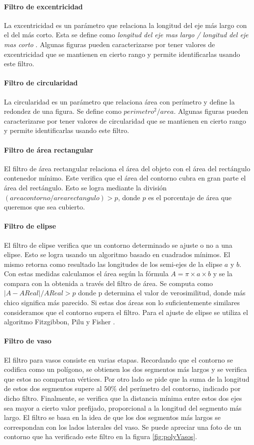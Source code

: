 	\paragraph{Filtro de excentricidad}
	La excentricidad es un parámetro que relaciona la longitud del eje más largo con el del más corto. Esta se define como 
	\textit { longitud del eje mas largo / longitud del eje mas corto}  . Algunas figuras pueden caracterizarse por tener valores de excentricidad
	que se mantienen en cierto rango y permite identificarlas usando este filtro.
	\paragraph{Filtro de circularidad}
	La circularidad es un parámetro que relaciona área con perímetro y define la redondez de una figura. Se define como $perimetro^2/area$. Algunas figuras pueden 
	caracterizarse por tener valores de circularidad que se mantienen en cierto rango y permite identificarlas usando este filtro.
	\paragraph{Filtro de área rectangular}
	El filtro de área rectangular relaciona el área del objeto con el área del rectángulo contenedor mínimo. Este verifica que el área
	del contorno cubra en gran parte el área del rectángulo. Esto se logra mediante la división $(area contorno / area rectangulo)> p$, donde 
	$p$ es el porcentaje de área que queremos que sea cubierto.
	\paragraph{Filtro de elipse}
	El filtro de elipse verifica que un contorno determinado se ajuste o no a una elipse. Esto se logra usando un algoritmo basado 
	en cuadrados mínimos. El mismo retorna como resultado las longitudes de los semi-ejes de la elipse $a$ y $b$. Con estas medidas calculamos
	el área según la fórmula $A=\pi\times a \times b$ y se la compara con la obtenida a través del filtro de área. Se computa como $|A-AReal|/ AReal > p$ donde p determina el
	valor de verosimilitud, donde más chico significa más parecido. Si estas dos áreas son lo suficientemente similares consideramos que el contorno supera el filtro. 
	Para el ajuste de elipse se utiliza el algoritmo Fitzgibbon, Pilu y Fisher \cite{Fitzgibbon99}.
	\paragraph{Filtro de vaso}
	El filtro para vasos consiste en varias etapas. Recordando que el contorno se codifica como un polígono, se obtienen los dos segmentos 
	más largos y se verifica que estos no compartan vértices. Por otro lado se pide que la suma de la longitud de estos dos segmentos supere al $50\%$ del 
	perímetro del contorno, indicado por dicho filtro. Finalmente, se verifica que la distancia mínima entre estos dos ejes sea mayor a cierto valor prefijado, proporcional a la
	longitud del segmento más largo. El filtro se basa en la idea de que 
	los dos segmentos más largos se correspondan con los lados laterales 
	del vaso.  Se puede apreciar una foto  de un contorno que ha 
	verificado este filtro en la figura \ref{fig:polyVasos}. 
